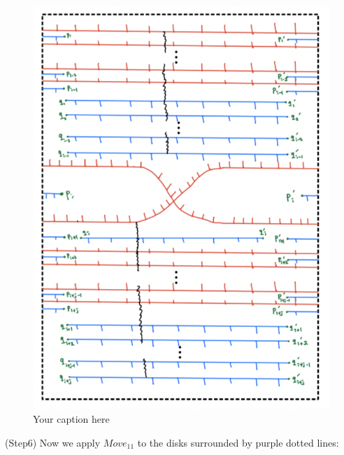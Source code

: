 \begin{figure}[H] %
    \centering
    \includegraphics[width=\linewidth]{diagrams/theorem12/12.png} %
    \caption{Your caption here}
    \label{fig:your-label}
\end{figure}

(Step6) Now we apply $Move_{11}$ to the disks surrounded by purple dotted lines:

